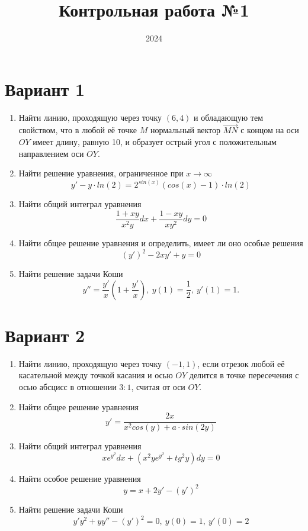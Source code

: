 \documentclass[a4paper]{article}
\title{Контрольная работа №1}
\date{2024}
\begin{document}
\maketitle

\section*{\centering Вариант 1}

\begin{enumerate}
    \item Найти линию, проходящую через точку $(6, 4)$ и обладающую тем свойством,
    что в любой её точке $M$ нормальный вектор $\overrightarrow{MN}$ с концом на оси $OY$ имеет длину,
    равную 10, и образует острый угол с положительным направлением оси $OY$.
    \item Найти решение уравнения, ограниченное при $x \rightarrow \infty$
    $$
        y' - y \cdot ln(2) = 2^{sin(x)}(cos(x) - 1) \cdot ln(2)
    $$
    \item Найти общий интеграл уравнения
    $$
        \dfrac{1 + xy}{x^2y}dx + \dfrac{1-xy}{xy^2}dy = 0
    $$
    \item Найти общее решение уравнения и определить, имеет ли оно особые решения
    $$
        (y')^2 - 2xy' + y = 0
    $$
    \item Найти решение задачи Коши
    $$
        y'' = \dfrac{y'}{x}\left(1 + \dfrac{y'}{x}\right),\ y(1) = \dfrac{1}{2},\ y'(1) = 1.
    $$
\end{enumerate}

\section*{\centering Вариант 2}

\begin{enumerate}
    \item Найти линию, проходящую через точку $(-1, 1)$,
    если отрезок любой её касательной между точкой касания и осью $OY$ делится в точке пересечения с осью абсцисс в отношении $3:1$,
    считая от оси $OY$.
    \item Найти общее решение уравнения
    $$
        y' = \dfrac{2x}{x^2cos(y) + a \cdot sin(2y)}
    $$
    \item Найти общий интеграл уравнения
    $$
        x e^{y^2}dx + (x^2ye^{y^2} + tg^2y)dy = 0
    $$
    \item Найти особое решение уравнения
    $$
        y = x + 2y' - (y')^2
    $$
    \item Найти решение задачи Коши
    $$
        y'y^2 + yy'' - (y')^2 = 0,\ y(0) = 1,\ y'(0) = 2
    $$
\end{enumerate}
\end{document}

